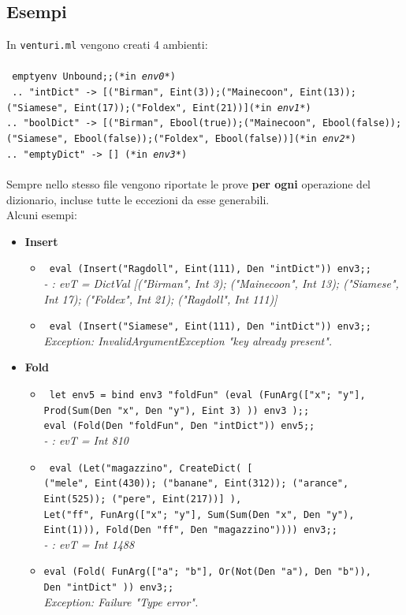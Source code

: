 \documentclass[11pt, a4paper]{article}
\begin{document}
\subsection{Esempi}
In \texttt{venturi.ml} vengono creati 4 ambienti:\\ \\
\texttt{
emptyenv Unbound;;(*in \emph{env0}*)\\{
.. "intDict" -> [("Birman", Eint(3));("Mainecoon", Eint(13));("Siamese", Eint(17));("Foldex", Eint(21))](*in \emph{env1}*)\\
.. "boolDict" -> [("Birman", Ebool(true));("Mainecoon", Ebool(false));("Siamese", Ebool(false));("Foldex", Ebool(false))](*in \emph{env2}*)\\
.. "emptyDict" -> [] (*in \emph{env3}*)}
}\\ \\
Sempre nello stesso file vengono riportate le prove \textbf{per ogni} operazione del dizionario, incluse tutte le eccezioni da esse generabili.\\
Alcuni esempi: 
\begin{itemize}
\item \textbf{Insert} 
\begin{itemize}
\item \texttt{
eval (Insert("Ragdoll", Eint(111), Den "intDict")) env3;;}\\\textit{- : evT =
DictVal
 [("Birman", Int 3); ("Mainecoon", Int 13); ("Siamese", Int 17);
  ("Foldex", Int 21); ("Ragdoll", Int 111)]}
\item \texttt{
		eval (Insert("Siamese", Eint(111), Den "intDict")) env3;;}\\\textit{Exception: InvalidArgumentException "key already present".
}
\end{itemize}
\item \textbf{Fold}
\begin{itemize}
\item \texttt{
let env5 = bind env3 "foldFun" (eval (FunArg(["x"; "y"], Prod(Sum(Den "x", Den "y"), Eint 3) )) env3 );;\\
eval (Fold(Den "foldFun", Den "intDict")) env5;;} \\ \textit{- : evT = Int 810}

\item \texttt{
eval (Let("magazzino", CreateDict( [\\ ("mele", Eint(430)); ("banane", Eint(312)); ("arance", Eint(525)); ("pere", Eint(217))] ),\\ 
	Let("ff", FunArg(["x"; "y"], Sum(Sum(Den "x", Den "y"), Eint(1))), Fold(Den "ff", Den "magazzino")))) env3;;}\\ \textit{- : evT = Int 1488}
	
\item \texttt{eval (Fold(
			FunArg(["a"; "b"], Or(Not(Den "a"), Den "b")),\\
			Den "intDict"  
		)) env3;;} \\ \textit{Exception: Failure "Type error".}
\end{itemize}
\end{itemize}
\end{document}
